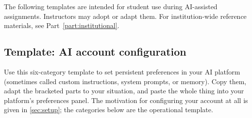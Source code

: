 \documentclass{SIAMbook2023}
\begin{document}
The following templates are intended for student use during AI-assisted assignments. Instructors may adopt or adapt them. For institution-wide reference materials, see Part~\ref{part:institutional}.

\subsection{Template: AI account configuration}
\label{app:ai-config}

Use this six-category template to set persistent preferences in your AI platform (sometimes called custom instructions, system prompts, or memory). Copy them, adapt the bracketed parts to your situation, and paste the whole thing into your platform's preferences panel. The motivation for configuring your account at all is given in \cref{sec:setup}; the categories below are the operational template.
\end{document}
